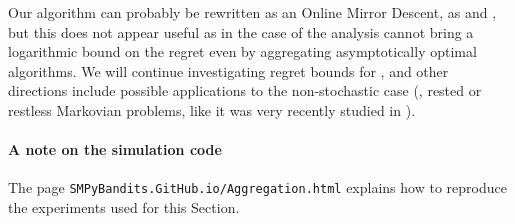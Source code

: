 Our \Aggr{} algorithm can probably be rewritten as an Online Mirror Descent, as \ExpQ{} and \CORRAL,
but this does not appear useful as in the case of \CORRAL{}  the analysis cannot bring a logarithmic bound on the regret even by aggregating asymptotically optimal algorithms.
We will continue investigating regret bounds for \Aggr,
and other directions include possible applications to the non-stochastic case (\eg, rested or restless Markovian problems, like it was very recently studied in \cite{Luo18}).

\paragraph{A note on the simulation code}
The page \texttt{SMPyBandits.GitHub.io/Aggregation.html} explains how to reproduce the experiments used for this Section.


% 
% 
